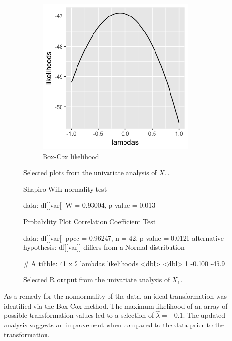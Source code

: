 \begin{figure}[H]
\begin{subfigure}{.33\textwidth}
  \centering
  \includegraphics[width=.8\linewidth]{plot_4_29_X1bxcx.png}
  \caption{Box-Cox likelihood}
  \label{fig:sfig3}
\end{subfigure}%
\caption{Selected plots from the univariate analysis of $X_1$.} 
\end{figure}
\begin{figure}[H]
\begin{rc}
	Shapiro-Wilk normality test

data:  df[[var]]
W = 0.93004, p-value = 0.013


	Probability Plot Correlation Coefficient Test

data:  df[[var]]
ppcc = 0.96247, n = 42, p-value = 0.0121
alternative hypothesis: df[[var]] differs from a Normal distribution

# A tibble: 41 x 2
  lambdas likelihoods
    <dbl>       <dbl>
1  -0.100       -46.9
\end{rc}
\caption{Selected R output from the univariate analysis of $X_1$.}
\end{figure}
As a remedy for the nonnormality of the data, an ideal transformation was identified via the Box-Cox method. The maximum likelihood of an array of possible transformation values led to a selection of $\hat{\lambda} = -0.1$. The updated analysis suggests an improvement when compared to the data prior to the transformation.
